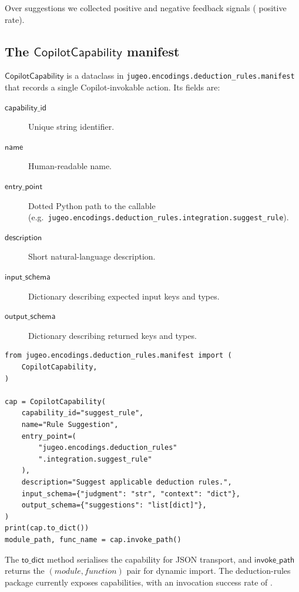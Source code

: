 \documentclass[11pt]{article}
\newcommand{\CC}{\ensuremath{\mathsf{CopilotCapability}}}
\begin{document}
Over \ppLXXXVIIruleSuggestionsTotal{} suggestions we collected
\ppLXXXVIIfeedbackPositive{} positive and
\ppLXXXVIIfeedbackNegative{} negative feedback signals
(\ppLXXXVIIfeedbackPositiveRate{} positive rate).

\subsection{The \texorpdfstring{$\CC$}{CopilotCapability}
  manifest}\label{ssec:capability}

$\CC$ is a dataclass in
\texttt{jugeo.encodings.deduction\_rules.manifest} that records a
single Copilot-invokable action.  Its fields are:

\begin{description}
  \item[$\mathsf{capability\_id}$] Unique string identifier.
  \item[$\mathsf{name}$] Human-readable name.
  \item[$\mathsf{entry\_point}$] Dotted Python path to the
    callable (e.g.\
    \texttt{jugeo.encodings.deduction\_rules.integration.suggest\_rule}).
  \item[$\mathsf{description}$] Short natural-language description.
  \item[$\mathsf{input\_schema}$] Dictionary describing expected
    input keys and types.
  \item[$\mathsf{output\_schema}$] Dictionary describing returned
    keys and types.
\end{description}

\begin{lstlisting}[style=jugeo-python,
  caption={$\CC$ definition and serialisation.},label=lst:cap]
from jugeo.encodings.deduction_rules.manifest import (
    CopilotCapability,
)

cap = CopilotCapability(
    capability_id="suggest_rule",
    name="Rule Suggestion",
    entry_point=(
        "jugeo.encodings.deduction_rules"
        ".integration.suggest_rule"
    ),
    description="Suggest applicable deduction rules.",
    input_schema={"judgment": "str", "context": "dict"},
    output_schema={"suggestions": "list[dict]"},
)
print(cap.to_dict())
module_path, func_name = cap.invoke_path()
\end{lstlisting}

\noindent
The $\mathsf{to\_dict}$ method serialises the capability for JSON
transport, and $\mathsf{invoke\_path}$ returns the
$(\mathit{module}, \mathit{function})$ pair for dynamic import.
The deduction-rules package currently exposes
\ppLXXXVIIcapabilityCount{} capabilities, with an invocation
success rate of \ppLXXXVIIcapabilityInvokeSuccess.
\end{document}
